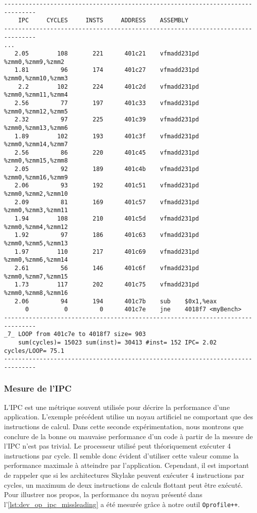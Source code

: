  \begin{lstlisting}[label=lst:dev_op_dependance_8_streams, caption=L'optimisation du noyau précedent permet de présenter au processeur 8 chaînes de calculs indépendantes.]
-------------------------------------------------------------------------------
    IPC     CYCLES     INSTS     ADDRESS    ASSEMBLY                         
-------------------------------------------------------------------------------
...
   2.05        108       221      401c21    vfmadd231pd %zmm0,%zmm9,%zmm2
   1.81         96       174      401c27    vfmadd231pd %zmm0,%zmm10,%zmm3
    2.2        102       224      401c2d    vfmadd231pd %zmm0,%zmm11,%zmm4
   2.56         77       197      401c33    vfmadd231pd %zmm0,%zmm12,%zmm5
   2.32         97       225      401c39    vfmadd231pd %zmm0,%zmm13,%zmm6
   1.89        102       193      401c3f    vfmadd231pd %zmm0,%zmm14,%zmm7
   2.56         86       220      401c45    vfmadd231pd %zmm0,%zmm15,%zmm8
   2.05         92       189      401c4b    vfmadd231pd %zmm0,%zmm16,%zmm9
   2.06         93       192      401c51    vfmadd231pd %zmm0,%zmm2,%zmm10
   2.09         81       169      401c57    vfmadd231pd %zmm0,%zmm3,%zmm11
   1.94        108       210      401c5d    vfmadd231pd %zmm0,%zmm4,%zmm12
   1.92         97       186      401c63    vfmadd231pd %zmm0,%zmm5,%zmm13
   1.97        110       217      401c69    vfmadd231pd %zmm0,%zmm6,%zmm14
   2.61         56       146      401c6f    vfmadd231pd %zmm0,%zmm7,%zmm15
   1.73        117       202      401c75    vfmadd231pd %zmm0,%zmm8,%zmm16
   2.06         94       194      401c7b    sub    $0x1,%eax
      0          0         0      401c7e    jne    4018f7 <myBench>
-------------------------------------------------------------------------------
_7_ LOOP from 401c7e to 4018f7 size= 903 
    sum(cycles)= 15023 sum(inst)= 30413 #inst= 152 IPC= 2.02 cycles/LOOP= 75.1
-------------------------------------------------------------------------------

\end{lstlisting}   




    \subsubsection{Mesure de l'IPC}
    
        L'IPC est une métrique souvent utilisée pour décrire la performance d'une application. L'exemple précédent utilise un noyau artificiel ne comportant que des instructions de calcul. Dans cette seconde expérimentation, nous montrons que conclure de la bonne ou mauvaise performance d'un code à partir de la mesure de l'IPC n'est pas trivial. Le processeur utilisé peut théoriquement exécuter 4 instructions par cycle. Il semble donc évident d'utiliser cette valeur comme la performance maximale à atteindre par l'application. Cependant, il est important de rappeler que si les architectures Skylake peuvent exécuter 4 instructions par cycles, un maximum de deux instructions de calculs flottant peut être exécuté. Pour illustrer nos propos, la performance du noyau présenté dans l'\autoref{lst:dev_op_ipc_missleading} a été mesurée grâce à notre outil \verb=Oprofile++=.

